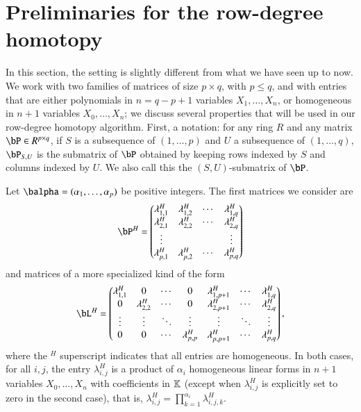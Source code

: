\documentclass[amsthm]{elsart}
\begin{document}
\section{Preliminaries for the row-degree homotopy}\label{sec:prel-row}

In this section, the setting is slightly different from what we have
seen up to now.  We work with two families of matrices of size $p
\times q$, with $p \le q$, and with entries that are either
polynomials in $n=q-p+1$ variables $X_1,\dots,X_n$, or homogeneous in
$n+1$ variables $X_0,\dots,X_n$; we discuss several properties that
will be used in our row-degree homotopy algorithm. First, a notation:
for any ring $R$ and any matrix $\bP \in R^{p\times q}$, if $S$ is a
subsequence of $(1,\dots,p)$ and $U$ a subsequence of $(1,\dots,q)$,
$\bP_{S,U}$ is the submatrix of $\bP$ obtained by keeping rows indexed
by $S$ and columns indexed by $U$. We also call this the
$(S,U)$-submatrix of $\bP$.

Let $\balpha=(\alpha_1,\dots,\alpha_p)$ be positive integers. The
first matrices we consider are
\begin{align}\label{eqdef:type2}
\bP^H= \left( \begin{matrix}
\lambda^H_{1,1} & \lambda^H_{1,2} & \cdots & \lambda^H_{1, q}\\
 \lambda^H_{2,1} &  \lambda^H_{2,2} & \cdots & \lambda^H_{2, q}\\
 \vdots & & & \vdots\\
 \lambda^H_{p,1} &  \lambda^H_{p,2}& \cdots & \lambda^H_{p, q}
\end{matrix} \right)
\end{align}
and matrices of a more specialized kind of the form
\begin{align}\label{eqdef:type1}
\bL^H= \left( \begin{matrix}
\lambda^H_{1,1} & 0 & \cdots & 0 & \lambda^H_{1,p+1} & \cdots & \lambda^H_{1, q}\\
0 & \lambda^H_{2,2} & \cdots & 0 & \lambda^H_{2,p+1} & \cdots & \lambda^H_{2, q}\\
\vdots & \vdots & \ddots & \vdots & \vdots & \ddots & \vdots\\
0 & 0 & \cdots & \lambda^H_{p,p} & \lambda^H_{p,p+1} & \cdots & \lambda^H_{p, q}
\end{matrix} \right),
\end{align}
where the ${}^H$ superscript indicates that all entries are
homogeneous.  In both cases, for all $i,j$, the entry $\lambda^H_{i,j}$
is a product of $\alpha_i$ homogeneous linear forms in $n+1$ variables
$X_0,\dots,X_n$ with coefficients in $\mathbb{K}$ (except when
$\lambda^H_{i,j}$ is explicitly set to zero in the second case), that
is, $\lambda^H_{i,j}=\prod_{k=1}^{\alpha_i} \lambda^H_{i,j,k}$.  
\end{document}
